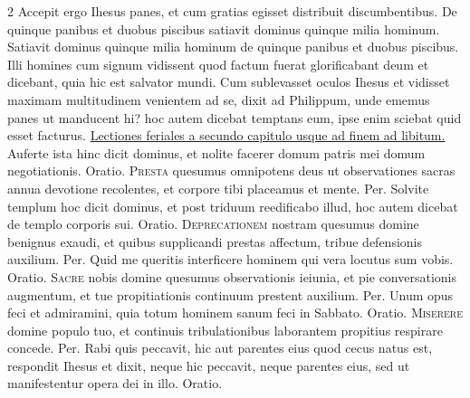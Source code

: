 \begin{multicols*}{2}
 Accepit ergo Ihesus panes, et cum gratias egisset distribuit discumbentibus.
 De quinque panibus et duobus piscibus satiavit dominus quinque milia hominum.
 Satiavit dominus quinque milia hominum de quinque panibus et duobus piscibus.
 Illi homines cum signum vidissent quod factum fuerat glorificabant deum et dicebant, quia hic est salvator mundi.
 Cum sublevasset oculos Ihesus et vidisset maximam multitudinem venientem ad se, dixit ad Philippum, unde ememus panes ut manducent hi? hoc autem dicebat temptans eum, ipse enim sciebat quid esset facturus.
\newline \ul{Lectiones feriales a secundo capitulo usque ad finem ad libitum.}
 Auferte ista hinc dicit dominus, et nolite facerer domum patris mei domum negotiationis. {\color{Red} Oratio.}
\lettrine[lines=2]{\zallmancaps \color{Blue} P}{resta} quesumus omnipotens deus ut observationes sacras annua devotione recolentes, et corpore tibi placeamus et mente. Per.
 Solvite templum hoc dicit dominus, et post triduum reedificabo illud, hoc autem dicebat de templo corporis sui. {\color{Red} Oratio.}
\lettrine[lines=2]{\zallmancaps \color{Red} D}{eprecationem} nostram quesumus domine benignus exaudi, et quibus supplicandi prestas affectum, tribue defensionis auxilium. Per.
 Quid me queritis interficere hominem qui vera locutus sum vobis. {\color{Red} Oratio.}
\lettrine[lines=2]{\zallmancaps \color{Blue} S}{acre} nobis domine quesumus observationis ieiunia, et pie conversationis augmentum, et tue propitiationis continuum prestent auxilium. Per.
 Unum opus feci et admiramini, quia totum hominem sanum feci in Sabbato. {\color{Red} Oratio.}
\lettrine[lines=2]{\zallmancaps \color{Red} M}{iserere} domine populo tuo, et continuis tribulationibus laborantem propitius respirare concede. Per.
 Rabi quis peccavit, hic aut parentes eius quod cecus natus est, respondit Ihesus et dixit, neque hic peccavit, neque parentes eius, sed ut manifestentur opera dei in illo. {\color{Red} Oratio.}

\end{multicols*}
